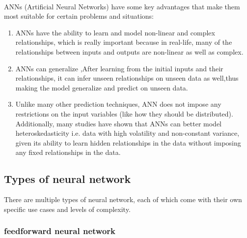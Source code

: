 \paragraph{}
ANNs (Artificial Neural Networks) have some key advantages that make them most suitable for certain problems and situations:
\begin{enumerate}
	\item ANNs have the ability to learn and model non-linear and complex relationships, which is really important because in real-life, many of the relationships between inputs and outputs are non-linear as well as complex.
	\item ANNs can generalize ,After learning from the initial inputs and their relationships, it can infer unseen relationships on unseen data as well,thus making the model generalize and predict on unseen data.
	\item  Unlike many other prediction techniques, ANN does not impose any restrictions on the input variables (like how they should be distributed). Additionally, many studies have shown that ANNs can better model heteroskedasticity i.e. data with high volatility and non-constant variance, given its ability to learn hidden relationships in the data without imposing any fixed relationships in the data. 
	
\end{enumerate}
\subsection{Types of neural network }
There are multiple types of neural network, each of which come with their own specific use cases and levels of complexity.

\subsubsection{\textbf feedforward neural network}

